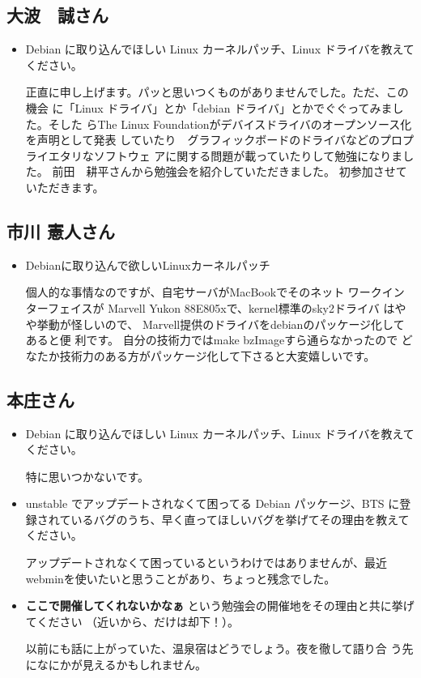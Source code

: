 \documentclass[mingoth,a4paper]{jsarticle}
\begin{document}
\subsection{大波　誠さん}
\begin{itemize}
\item Debian に取り込んでほしい Linux カーネルパッチ、Linux ドライバを教えてください。

正直に申し上げます。パッと思いつくものがありませんでした。ただ、この機会
に「Linux ドライバ」とか「debian ドライバ」とかでぐぐってみました。そした
らThe Linux Foundationがデバイスドライバのオープンソース化を声明として発表
していたり　グラフィックボードのドライバなどのプロプライエタリなソフトウェ
アに関する問題が載っていたりして勉強になりました。
前田　耕平さんから勉強会を紹介していただきました。
初参加させていただきます。
\end{itemize}

\subsection{市川 憲人さん}
\begin{itemize}
\item Debianに取り込んで欲しいLinuxカーネルパッチ

個人的な事情なのですが、自宅サーバがMacBookでそのネット 
ワークインターフェイスが
Marvell Yukon 88E805xで、kernel標準のsky2ドライバ 
はやや挙動が怪しいので、
Marvell提供のドライバをdebianのパッケージ化してあると便 
利です。
自分の技術力ではmake bzImageすら通らなかったので
どなたか技術力のある方がパッケージ化して下さると大変嬉しいです。
\end{itemize}

\subsection{本庄さん}
\begin{itemize}
\item Debian に取り込んでほしい Linux カーネルパッチ、Linux ドライバを教えてください。

特に思いつかないです。

\item unstable でアップデートされなくて困ってる Debian パッケージ、BTS に登録されているバグのうち、早く直ってほしいバグを挙げてその理由を教えてください。

アップデートされなくて困っているというわけではありませんが、最近
webminを使いたいと思うことがあり、ちょっと残念でした。


\item {\bf ここで開催してくれないかなぁ} という勉強会の開催地をその理由と共に挙げてください （近いから、だけは却下！）。

以前にも話に上がっていた、温泉宿はどうでしょう。夜を徹して語り合
う先になにかが見えるかもしれません。
\end{itemize}
\end{document}
